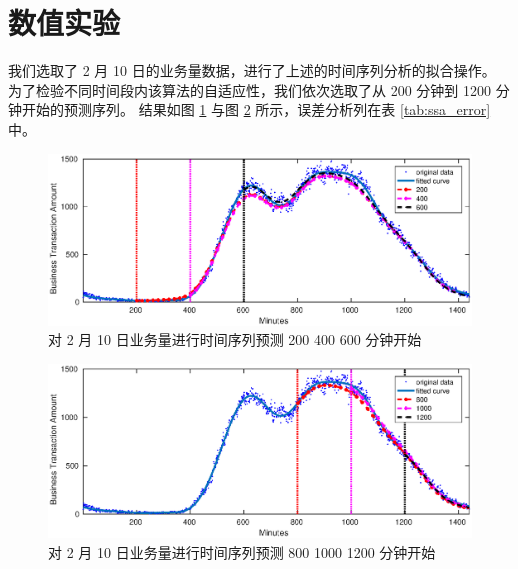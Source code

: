 \documentclass[a4paper]{article}
\begin{document}
\section{数值实验}
我们选取了 2 月 10  日的业务量数据，进行了上述的时间序列分析的拟合操作。
为了检验不同时间段内该算法的自适应性，我们依次选取了从 200 分钟到 1200 分钟开始的预测序列。
结果如图 \ref{fig:ssa-200-400-600} 与图 \ref{fig:ssa-800-1000-1200} 所示，误差分析列在表 \ref{tab:ssa_error} 中。
\begin{figure}[htbp]
	\centering
	\includegraphics[scale=0.6]{pic/trade_amount_2_10_200_400_600.eps}
	\caption{对 2 月 10 日业务量进行时间序列预测 200 400 600 分钟开始}
    \label{fig:ssa-200-400-600}
\end{figure}
\begin{figure}[htbp]
	\centering
	\includegraphics[scale=0.6]{pic/trade_amount_2_10_800_1000_1200.eps}
	\caption{对 2 月 10 日业务量进行时间序列预测 800 1000 1200 分钟开始}
    \label{fig:ssa-800-1000-1200}
\end{figure}
\end{document}
